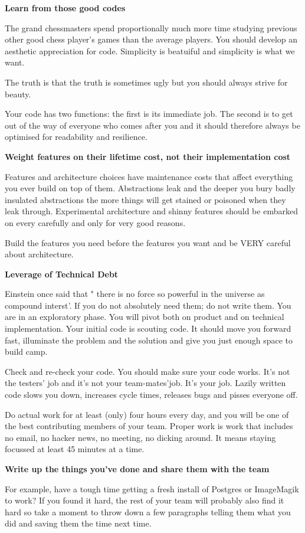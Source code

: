 {\bf Learn from those good codes}
\par
The grand chessmasters spend proportionally much more time studying previous other good chess player's games than the average players.
You should develop an aesthetic appreciation for code.
Simplicity is beatuiful and simplicity is what we want.

The truth is that the truth is sometimes ugly but you should always strive for beauty.

Your code has two functions: the first is its immediate job.
The second is to get out of the way of everyone who comes after you
and it should therefore always be optimised for readability and resilience.

{\bf Weight features on their lifetime cost, not their implementation cost}
\par
Features and architecture choices have maintenance costs that affect everything you ever build on top of them.
Abstractions leak and the deeper you bury badly insulated abstractions the more things will get stained or poisoned when they leak through.
Experimental architecture and shinny features should be embarked on every carefully and only for very good reasons.

Build the features you need before the features you want and be VERY careful about architecture.

{\bf Leverage of Technical Debt}
\par 
Einstein once said that " there is no force so powerful in the universe as compound interst'.  
If you do not absolutely need them; 
do not write them.
You are in an exploratory phase. 
You will pivot both on product and on technical implementation.
Your initial code is scouting code.
It should move you forward fast, illuminate the problem and the solution and give you just enough space to build camp.

Check and re-check your code.
You should make sure your code works. 
It's not the testers' job and it's not your team-mates'job.
It's your job.
Lazily written code slows you down, increases cycle times, releases bugs and pisses everyone off.

Do actual work for at least (only) four hours every day, and you will be one of the best contributing members of your team.
Proper work is work that includes no email, no hacker news, no meeting, no dicking around. It means staying focussed at least 45 minutes at a time.

{\bf Write up the things you've done and share them with the team}
\par
For example, have a tough time getting a fresh install of Postgres or ImageMagik to work? If you found it hard, the rest of your team will probably also find it hard so take a moment to throw down a few paragraphs telling them what you did and saving them the time next time.

